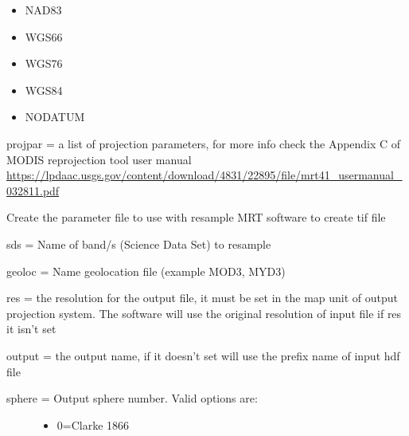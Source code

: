\documentclass[a4paper,11pt,oneside]{sphinxmanual}
\begin{document}
\begin{fulllineitems}
\begin{fulllineitems}
\begin{description}
\begin{itemize}
\item {} 
NAD83

\item {} 
WGS66

\item {} 
WGS76

\item {} 
WGS84

\item {} 
NODATUM

\end{itemize}

\end{description}

projpar = a list of projection parameters, for more info check the
Appendix C of MODIS reprojection tool user manual
\href{https://lpdaac.usgs.gov/content/download/4831/22895/file/mrt41\_usermanual\_032811.pdf}{https://lpdaac.usgs.gov/content/download/4831/22895/file/mrt41\_usermanual\_032811.pdf}

\end{fulllineitems}


\begin{fulllineitems}
\label{pymodis/pymodis:pymodis.parsemodis.parseModis.confResample_swath}
Create the parameter file to use with resample MRT software to create
tif file

sds = Name of band/s (Science Data Set) to resample

geoloc = Name geolocation file (example MOD3, MYD3)

res = the resolution for the output file, it must be set in the map
unit of output projection system. The software will use the
original resolution of input file if res it isn't set

output = the output name, if it doesn't set will use the prefix name
of input hdf file
\begin{description}
\item[{sphere = Output sphere number. Valid options are:}] \leavevmode\begin{itemize}
\item {} 
0=Clarke 1866


\end{itemize}
\end{description}
\end{fulllineitems}
\end{fulllineitems}
\end{document}
